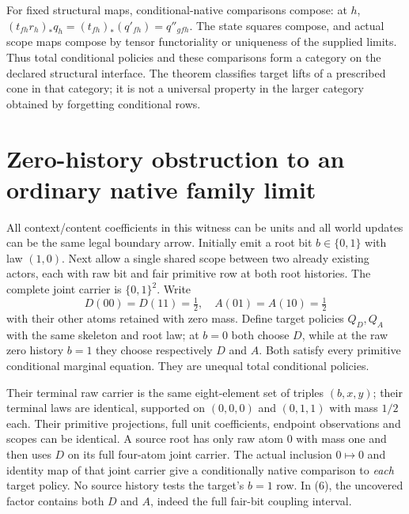 \documentclass[11pt]{article}
\begin{document}
For fixed structural maps, conditional-native comparisons compose: at $h$, $(t_{fh}r_h)_*q_h=(t_{fh})_*(q'_{fh})=q''_{gfh}$. The state squares compose, and actual scope maps compose by tensor functoriality or uniqueness of the supplied limits. Thus total conditional policies and these comparisons form a category on the declared structural interface. The theorem classifies target lifts of a prescribed cone in that category; it is not a universal property in the larger category obtained by forgetting conditional rows.

\section{Zero-history obstruction to an ordinary native family limit}
All context/content coefficients in this witness can be units and all world updates can be the same legal boundary arrow. Initially emit a root bit $b\in\{0,1\}$ with law $(1,0)$. Next allow a single shared scope between two already existing actors, each with raw bit and fair primitive row at both root histories. The complete joint carrier is $\{0,1\}^2$. Write
\[
 D(00)=D(11)=\tfrac12,\quad A(01)=A(10)=\tfrac12
\]
with their other atoms retained with zero mass. Define target policies $Q_D,Q_A$ with the same skeleton and root law; at $b=0$ both choose $D$, while at the raw zero history $b=1$ they choose respectively $D$ and $A$. Both satisfy every primitive conditional marginal equation. They are unequal total conditional policies.

Their terminal raw carrier is the same eight-element set of triples $(b,x,y)$; their terminal laws are identical, supported on $(0,0,0)$ and $(0,1,1)$ with mass $1/2$ each. Their primitive projections, full unit coefficients, endpoint observations and scopes can be identical. A source root has only raw atom $0$ with mass one and then uses $D$ on its full four-atom joint carrier. The actual inclusion $0\mapsto0$ and identity map of that joint carrier give a conditionally native comparison to \emph{each} target policy. No source history tests the target's $b=1$ row. In (6), the uncovered factor contains both $D$ and $A$, indeed the full fair-bit coupling interval.
\end{document}
